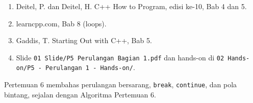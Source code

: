 \documentclass[a4paper]{article}
\begin{document}
\begin{enumerate}
\item Deitel, P. dan Deitel, H. C++ How to Program, edisi ke-10, Bab 4 dan 5.
\item learncpp.com, Bab 8 (loops).
\item Gaddis, T. Starting Out with C++, Bab 5.
\item Slide \texttt{01 Slide/P5 Perulangan Bagian 1.pdf} dan hands-on di \texttt{02 Hands-on/P5 - Perulangan 1 - Hands-on/}.
\end{enumerate}
\begin{Penting}
Pertemuan 6 membahas perulangan bersarang, \texttt{break}, \texttt{continue}, dan pola bintang, sejalan dengan Algoritma Pertemuan 6.
\end{Penting}
\end{document}

